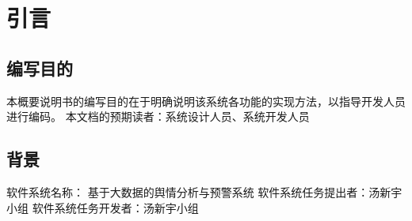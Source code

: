 \section{引言}

\subsection{编写目的}
本概要说明书的编写目的在于明确说明该系统各功能的实现方法，以指导开发人员进行编码。\newline
本文档的预期读者：系统设计人员、系统开发人员
\subsection{背景}
软件系统名称： 基于大数据的舆情分析与预警系统\newline
软件系统任务提出者：汤新宇小组\newline
软件系统任务开发者：汤新宇小组